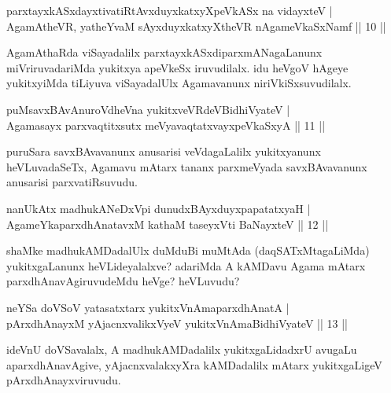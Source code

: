 \begin{shl}
parxtayxkASxdayxtivatiRtAvxduyxkatxyXpeVkASx na vidayxteV |\\
AgamAtheVR, yatheYvaM sAyxduyxkatxyXtheVR nA\s \s gameVkaSxNamf \hfill || 10 || 
\end{shl}

\begin{artha}
AgamAthaRda viSayadalilx parxtayxkASxdiparxmANagaLanunx miVriruvadariMda yukitxya apeVkeSx iruvudilalx. idu heVgoV hAgeye yukitxyiMda tiLiyuva viSayadalUlx Agamavanunx niriVkiSxsuvudilalx.
\end{artha}


\begin{shl}
puMsavxBAvAnuroVdheVna yukitxveVRdeV\s BidhiVyateV |\\
Agamasayx parxvaqtitxsutx meVyavaqtatxvayxpeVkaSxyA \hfill || 11 ||
\end{shl}

\begin{artha}
puruSara savxBAvavanunx anusarisi veVdagaLalilx yukitxyanunx heVLuvadaSeTx, Agamavu mAtarx tananx parxmeVyada savxBAvavanunx anusarisi parxvatiRsuvudu.
\end{artha}


\begin{shl}
nanUkAtx madhukANeDxV\s pi dunudxBAyxduyxpapatatxyaH |\\
AgameYkaparxdhAnatavxM kathaM taseyxVti BaNayxteV \hfill || 12 || 
\end{shl}

\begin{artha}
shaMke \mdash  madhukAMDadalUlx duMduBi muMtAda (daqSATxMtagaLiMda) yukitxgaLanunx heVLideyalalxve? adariMda A kAMDavu Agama mAtarx parxdhAnavAgiruvudeMdu heVge? heVLuvudu?
\end{artha}


\begin{shl}
neYSa doVSoV yatasatxtarx yukitxVnAmaparxdhAnatA |\\
pArxdhAnayxM yAjacnxvalikxVyeV yukitxVnAmaBidhiVyateV \hfill || 13 || 
\end{shl}

\begin{artha}
ideVnU doVSavalalx, A madhukAMDadalilx yukitxgaLidadxrU avugaLu aparxdhAnavAgive, yAjacnxvalakxyXra kAMDadalilx mAtarx yukitxgaLigeV pArxdhAnayxviruvudu.
\end{artha}

